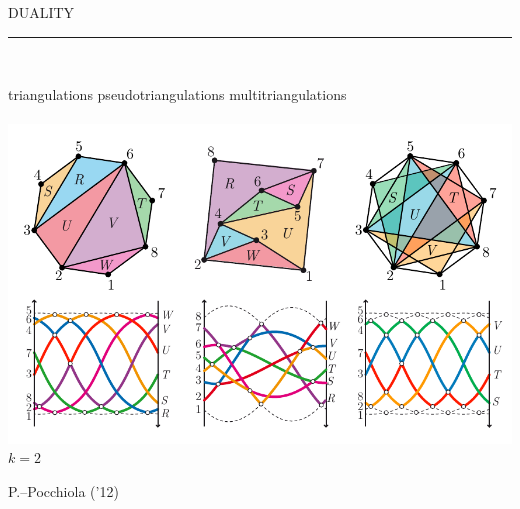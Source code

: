 \documentclass[12pt,titlepage,landscape,a4paper]{article}
\newcommand{\textemoyen}{\fontsize{23}{27}\selectfont}
\newenvironment{slide}[1]
{
\newpage
\begin{center}
{\blue \textemoyen \uppercase{#1}}\\
\end{center}
\vspace{-1cm}
\rule{\textwidth}{0.5 pt}\\
\vspace{-.8cm}
}
{\vspace*{-3cm}}
\newcommand{\violet}{\color{violet}} %
\newcommand{\blue}{\color{blue}} %
\newcommand{\papier}[1]{{\violet\fontsize{15}{20}\selectfont #1}} %
\begin{document}
\begin{slide}{Duality}
\hspace{1.6cm} triangulations \hspace{3.4cm} pseudotriangulations \hspace{2.5cm} multitriangulations\\
\vspace{-.5cm}\\
\vspace*{-2cm}
\hspace*{-.6cm}\includegraphics[scale=1.9]{geometricStructures7}
\vspace{-8.5cm} \\ \hspace*{25.7cm} ${k=2}$

\vspace{7.6cm}
\papier{P.--Pocchiola ('12)}

\vspace*{-3cm}
\end{slide}

%
%

\end{document}
